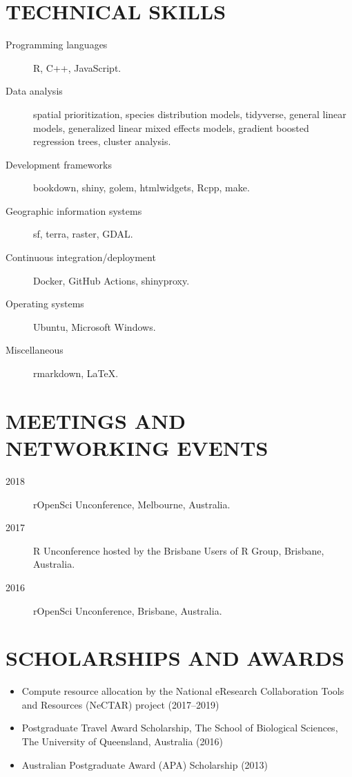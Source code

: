 \documentclass[12pt,a4paper]{article}
\begin{document}
\section*{TECHNICAL SKILLS}


\begin{description}

\item[Programming languages] R, C++, JavaScript.

\item[Data analysis] spatial prioritization, species distribution models, tidyverse, general linear models, generalized linear mixed effects models, gradient boosted regression trees, cluster analysis.

\item[Development frameworks] bookdown, shiny, golem, htmlwidgets, Rcpp, make.

\item[Geographic information systems] sf, terra, raster, GDAL.

\item[Continuous integration/deployment] Docker, GitHub Actions, shinyproxy.

\item[Operating systems] Ubuntu, Microsoft Windows.

\item[Miscellaneous] rmarkdown, LaTeX.

\end{description}

\section*{MEETINGS AND NETWORKING EVENTS}
\begin{description}

\item[2018] rOpenSci Unconference, Melbourne, Australia.

\item[2017] R Unconference hosted by the Brisbane Users of R Group, Brisbane, Australia.

\item[2016] rOpenSci Unconference, Brisbane, Australia.
\end{description}

\section*{SCHOLARSHIPS AND AWARDS}
\begin{itemize}

\item Compute resource allocation by the National eResearch Collaboration Tools and Resources (NeCTAR) project (2017--2019)

\item Postgraduate Travel Award Scholarship, The School of Biological Sciences, The University of Queensland, Australia (2016)

\item Australian Postgraduate Award (APA) Scholarship (2013)

\end{itemize}
\end{document}
